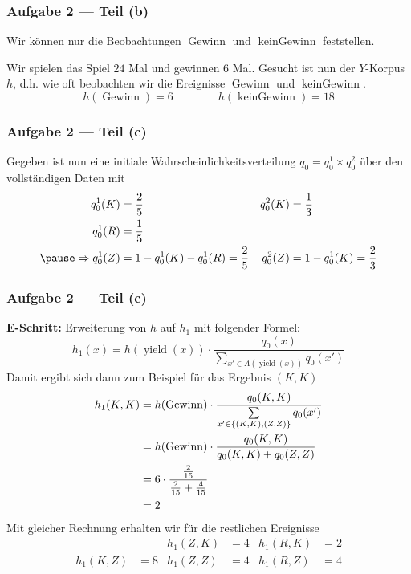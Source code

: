 \documentclass{beamer}
\DeclareMathOperator{\yield}{yield}
\DeclareMathOperator{\win}{Gewinn}
\DeclareMathOperator{\nowin}{kein Gewinn}
\begin{document}
\begin{frame} \frametitle{Aufgabe 2 --- Teil (b)}
	\justifying \small 
	Wir können nur die Beobachtungen $\win$ und $\nowin$ feststellen. 
	
	Wir spielen das Spiel $24$ Mal und gewinnen $6$ Mal. Gesucht ist nun der $Y$-Korpus $h$, d.h. wie oft beobachten wir die Ereignisse $\win$ und $\nowin$.
	\pause
	\begin{equation*}
		h(\win) = 6 \qquad\qquad h(\nowin) = 18
	\end{equation*}
\end{frame}

\begin{frame} \frametitle{Aufgabe 2 --- Teil (c)}
	\justifying \footnotesize
	Gegeben ist nun eine initiale Wahrscheinlichkeitsverteilung $q_0 = q_0^1 \times q_0^2$ über den vollständigen Daten mit
	\begin{align*}
	q_0^1(K) &= \frac{2}{5} & q_0^2(K) &= \frac{1}{3} \\
	q_0^1(R) &= \frac{1}{5} \\ \pause
	\Rightarrow
	q_0^1(Z) &= 1 - q_0^1(K) - q_0^1(R) = \frac{2}{5} 
	&
	q_0^2(Z) &= 1 - q_0^1(K) = \frac{2}{3}
	\end{align*}
	
\end{frame}

\begin{frame} \frametitle{Aufgabe 2 --- Teil (c)}
	\justifying \footnotesize
	\textbf{E-Schritt:} Erweiterung von $h$ auf $h_1$ mit folgender Formel:
	\begin{equation*}
		h_1(x) = h(\yield(x)) \cdot \frac{q_0(x)}{\sum\limits_{x' \in A(\yield(x))} q_0(x')}
	\end{equation*}
	\pause
	Damit ergibt sich dann zum Beispiel für das Ergebnis $(K,K)$
	\begin{align*}
		h_1(K,K) &= h(\win) \cdot \frac{q_0(K,K)}{\sum\limits_{x' \in \menge{(K,K),(Z,Z)}} q_0(x')} \\
		&= h(\win) \cdot \frac{q_0(K,K)}{q_0(K,K) + q_0(Z,Z)} \\
		&= 6 \cdot \frac{\frac{2}{15}}{\frac{2}{15} + \frac{4}{15}} \\
		&= 2
	\end{align*}
	\pause
	Mit gleicher Rechnung erhalten wir für die restlichen Ereignisse
	\begin{align*}
		 && h_1(Z,K) &= 4 & h_1(R,K) &= 2 \\
		h_1(K,Z) &= 8 & h_1(Z,Z) &= 4 & h_1(R,Z) &= 4
	\end{align*}
\end{frame}
\end{document}
